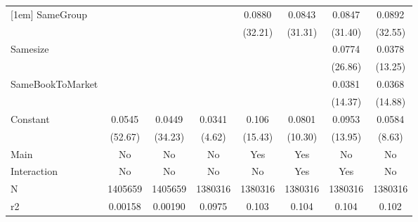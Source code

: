 {\begin{tabular}{l*{7}{c}}
[1em]
SameGroup           &                     &                     &                     &      0.0880\sym{***}&      0.0843\sym{***}&      0.0847\sym{***}&      0.0892\sym{***}\\
                    &                     &                     &                     &     (32.21)         &     (31.31)         &     (31.40)         &     (32.55)         \\
[1em]
Samesize            &                     &                     &                     &                     &                     &      0.0774\sym{***}&      0.0378\sym{***}\\
                    &                     &                     &                     &                     &                     &     (26.86)         &     (13.25)         \\
[1em]
SameBookToMarket    &                     &                     &                     &                     &                     &      0.0381\sym{***}&      0.0368\sym{***}\\
                    &                     &                     &                     &                     &                     &     (14.37)         &     (14.88)         \\
[1em]
Constant            &      0.0545\sym{***}&      0.0449\sym{***}&      0.0341\sym{***}&       0.106\sym{***}&      0.0801\sym{***}&      0.0953\sym{***}&      0.0584\sym{***}\\
                    &     (52.67)         &     (34.23)         &      (4.62)         &     (15.43)         &     (10.30)         &     (13.95)         &      (8.63)         \\
\hline
Main                &          No         &          No         &          No         &         Yes         &         Yes         &          No         &          No         \\
Interaction         &          No         &          No         &          No         &          No         &         Yes         &         Yes         &          No         \\
N                   &     1405659         &     1405659         &     1380316         &     1380316         &     1380316         &     1380316         &     1380316         \\
r2                  &     0.00158         &     0.00190         &      0.0975         &       0.103         &       0.104         &       0.104         &       0.102         \\

\end{tabular}}
